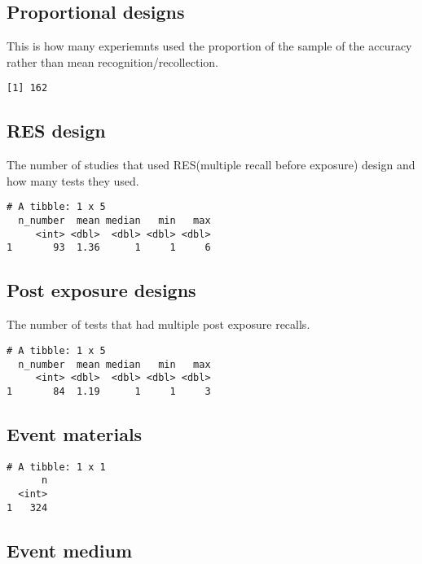 \documentclass[
  letterpaper,
  DIV=11,
  numbers=noendperiod]{scrartcl}
\begin{document}
\hypertarget{proportional-designs}{%
\subsection{Proportional designs}\label{proportional-designs}}

This is how many experiemnts used the proportion of the sample of the
accuracy rather than mean recognition/recollection.

\begin{verbatim}
[1] 162
\end{verbatim}

\hypertarget{res-design}{%
\subsection{RES design}\label{res-design}}

The number of studies that used RES(multiple recall before exposure)
design and how many tests they used.

\begin{verbatim}
# A tibble: 1 x 5
  n_number  mean median   min   max
     <int> <dbl>  <dbl> <dbl> <dbl>
1       93  1.36      1     1     6
\end{verbatim}

\hypertarget{post-exposure-designs}{%
\subsection{Post exposure designs}\label{post-exposure-designs}}

The number of tests that had multiple post exposure recalls.

\begin{verbatim}
# A tibble: 1 x 5
  n_number  mean median   min   max
     <int> <dbl>  <dbl> <dbl> <dbl>
1       84  1.19      1     1     3
\end{verbatim}

\hypertarget{event-materials}{%
\subsection{Event materials}\label{event-materials}}

\begin{verbatim}
# A tibble: 1 x 1
      n
  <int>
1   324
\end{verbatim}

\hypertarget{event-medium}{%
\subsection{Event medium}\label{event-medium}}
\end{document}
